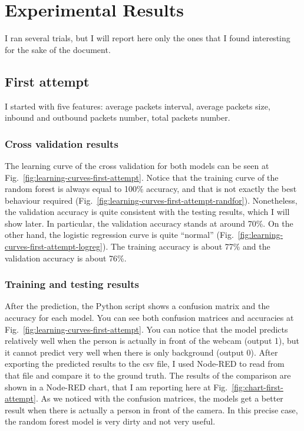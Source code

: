 \section{Experimental Results}

I ran several trials, but I will report here only the ones that I found interesting for the sake of the document.

\subsection{First attempt}
I started with five features: average packets interval, average packets size, inbound and outbound packets number, total packets number.

\subsubsection{Cross validation results}

The learning curve of the cross validation for both models can be seen at Fig.~\ref{fig:learning-curves-first-attempt}. Notice that the training curve of the random forest is always equal to 100\% accuracy, and that is not exactly the best behaviour required (Fig.~\ref{fig:learning-curves-first-attempt-randfor}). Nonetheless, the validation accuracy is quite consistent with the testing results, which I will show later. In particular, the validation accuracy stands at around 70\%. On the other hand, the logistic regression curve is quite ``normal'' (Fig.~\ref{fig:learning-curves-first-attempt-logreg}). The training accuracy is about 77\% and the validation accuracy is about 76\%.

\subsubsection{Training and testing results}

After the prediction, the Python script shows a confusion matrix and the accuracy for each model. You can see both confusion matrices and accuracies at Fig.~\ref{fig:learning-curves-first-attempt}. You can notice that the model predicts relatively well when the person is actually in front of the webcam (output 1), but it cannot predict very well when there is only background (output 0). After exporting the predicted results to the csv file, I used Node-RED to read from that file and compare it to the ground truth. The results of the comparison are shown in a Node-RED chart, that I am reporting here at Fig.~\ref{fig:chart-first-attempt}. As we noticed with the confusion matrices, the models get a better result when there is actually a person in front of the camera. In this precise case, the random forest model is very dirty and not very useful.

